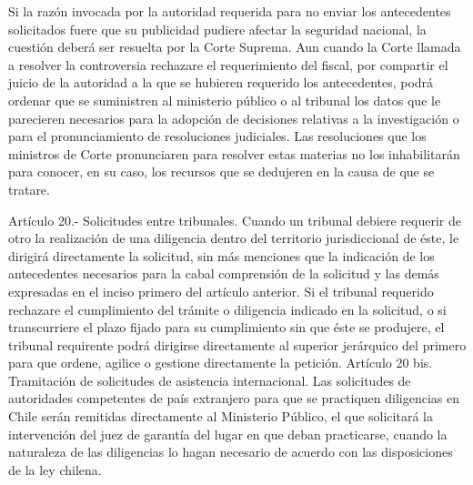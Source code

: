     Si la razón invocada por la autoridad requerida para no enviar los antecedentes solicitados fuere que su publicidad pudiere afectar la seguridad nacional, la cuestión deberá ser resuelta por la Corte Suprema.
    Aun cuando la Corte llamada a resolver la controversia rechazare el requerimiento del fiscal, por compartir el juicio de la autoridad a la que se hubieren requerido los antecedentes, podrá ordenar que se suministren al ministerio público o al tribunal los datos que le parecieren necesarios para la adopción de decisiones relativas a la investigación o para el pronunciamiento de resoluciones judiciales.
    Las resoluciones que los ministros de Corte pronunciaren para resolver estas materias no los inhabilitarán para conocer, en su caso, los recursos que se dedujeren en la causa de que se tratare.



    Artículo 20.- Solicitudes entre tribunales. Cuando un tribunal debiere requerir de otro la realización de una diligencia dentro del territorio jurisdiccional de éste, le dirigirá directamente la solicitud, sin más menciones que la indicación de los antecedentes necesarios para la cabal comprensión de la solicitud y las demás expresadas en el inciso primero del artículo anterior.
    Si el tribunal requerido rechazare el cumplimiento del trámite o diligencia indicado en la solicitud, o si transcurriere el plazo fijado para su cumplimiento sin que éste se produjere, el tribunal requirente podrá dirigirse directamente al superior jerárquico del primero para que ordene, agilice o gestione directamente la petición.
    Artículo 20 bis. Tramitación de solicitudes de asistencia internacional. Las solicitudes de autoridades competentes de país extranjero para que se practiquen diligencias en Chile serán remitidas directamente al Ministerio Público, el que solicitará la intervención del juez de garantía del lugar en que deban practicarse, cuando la naturaleza de las diligencias lo hagan necesario de acuerdo con las disposiciones de la ley chilena.

